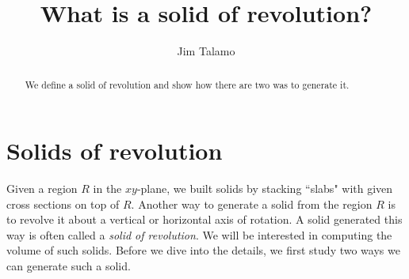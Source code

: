 \documentclass{ximera}
\author{Jim Talamo}
\title[Dig-In:]{What is a solid of revolution?}
\begin{document}
\begin{abstract}
  We define a solid of revolution and show how there are two was to generate it.
\end{abstract}
\maketitle


\section{Solids of revolution}

Given a region $R$ in the $xy$-plane, we built solids by stacking ``slabs" with given cross sections on top of $R$.  Another way to generate a solid from the region $R$ is to revolve it about a vertical or horizontal axis of rotation.  A solid generated this way is often called a \emph{solid of revolution}.  We will be interested in computing the volume of such solids.  Before we dive into the details, we first study two ways we can generate such a solid. 
\end{document}
